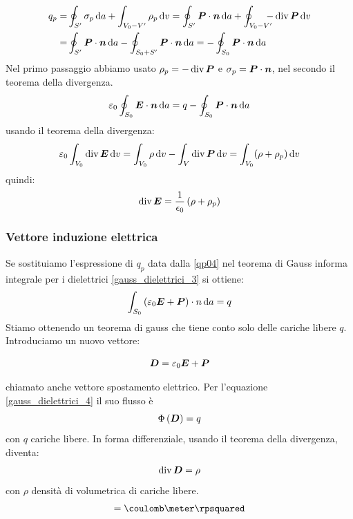\begin{equation}
\begin{split}
q_p=&\oint_{S'}\sigma_p\,\mathrm{d} a+\int_{V_0-V'}\rho_p\,\mathrm{d} v=\oint_{S'}\boldsymbol{P}\cdot\boldsymbol{n}\,\mathrm{d} a+\oint_{V_0-V'}\!\!\!\!\!-\operatorname{div}\boldsymbol{P}\,\mathrm{d} v\\
=&\oint_{S'}\boldsymbol{P}\cdot\boldsymbol{n}\,\mathrm{d} a-\oint_{S_0+S'}\boldsymbol{P}\cdot\boldsymbol{n}\,\mathrm{d} a=-\oint_{S_0}\boldsymbol{P}\cdot\boldsymbol{n}\,\mathrm{d} a
\end{split}
\label{qp04}
\end{equation}
Nel primo passaggio abbiamo usato $\rho_p=-\operatorname{div}\boldsymbol{P}$ e $\sigma_p=\boldsymbol{P}\cdot\boldsymbol{n}$, nel secondo il teorema della divergenza.
\begin{equation}
\varepsilon_0\oint_{S_0}\boldsymbol{E}\cdot\boldsymbol{n}\,\mathrm{d} a=q-\oint_{S_0}\boldsymbol{P}\cdot\boldsymbol{n}\,\mathrm{d} a
\end{equation}
usando il teorema della divergenza:
\begin{equation}
\varepsilon_0\int_{V_0}\operatorname{div}\boldsymbol{E}\,\mathrm{d} v=\int_{V_0}\rho\,\mathrm{d} v-\int_V\operatorname{div}\boldsymbol{P}\,\mathrm{d} v=\int_{V_0}(\rho+\rho_p)\,\mathrm{d} v
\end{equation}
quindi:
\begin{equation}
\operatorname{div}\boldsymbol{E}=\frac{1}{\epsilon_0}\left(\rho+\rho_p\right)
\end{equation}
\subsubsection{Vettore induzione elettrica}
Se sostituiamo l'espressione di $q_p$ data dalla \eqref{qp04} nel teorema di Gauss informa integrale per i dielettrici \eqref{gauss_dielettrici_3} si ottiene:
\begin{equation}
\int_{S_0}\left(\varepsilon_0\boldsymbol{E}+\boldsymbol{P}\right)\cdot n\,\mathrm{d} a= q
\label{gauss_dielettrici_4}
\end{equation}
Stiamo ottenendo un teorema di gauss che tiene conto solo delle cariche libere $q$. Introduciamo un nuovo vettore:
\begin{Def}
\begin{equation}
\boldsymbol{D}=\varepsilon_0\boldsymbol{E}+\boldsymbol{P}
\label{vettore_induzione_elettrica01}
\end{equation}
\end{Def}
chiamato anche vettore spostamento elettrico. Per l'equazione \eqref{gauss_dielettrici_4} il suo flusso è 
\begin{equation}
\Phi\left(\boldsymbol{D}\right)=q
\end{equation}
con $q$ cariche libere. In forma differenziale, usando il teorema della divergenza, diventa:
\begin{equation}
\operatorname{div}\boldsymbol{D}=\rho
\end{equation}
con $\rho$ densità di volumetrica di cariche libere.
\begin{equation*}
[D]=\coulomb\meter\rpsquared
\end{equation*}
